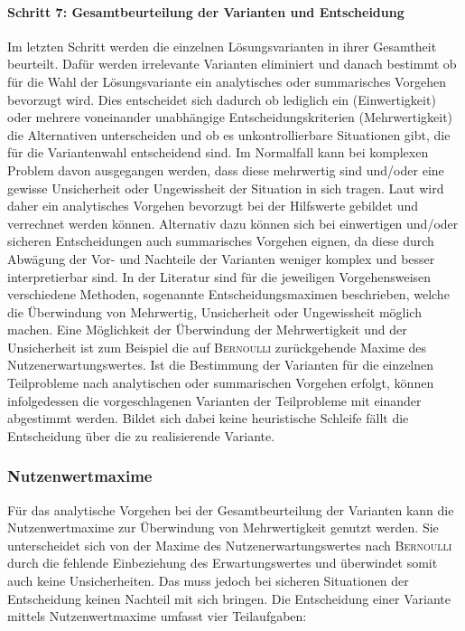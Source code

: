 \paragraph{Schritt 7: Gesamtbeurteilung der Varianten und Entscheidung} Im letzten Schritt werden die einzelnen Lösungsvarianten in ihrer Gesamtheit beurteilt. Dafür werden irrelevante Varianten eliminiert und danach bestimmt ob für die Wahl der Lösungsvariante ein analytisches oder summarisches Vorgehen bevorzugt wird. Dies entscheidet sich dadurch ob lediglich ein (Einwertigkeit) oder mehrere voneinander unabhängige Entscheidungskriterien (Mehrwertigkeit) die Alternativen unterscheiden und ob es unkontrollierbare Situationen gibt, die für die Variantenwahl entscheidend sind. Im Normalfall kann bei komplexen Problem davon ausgegangen werden, dass diese mehrwertig sind und/oder eine gewisse Unsicherheit oder Ungewissheit der Situation in sich tragen. Laut \cite{Grunig.2013} wird daher ein analytisches Vorgehen bevorzugt bei der Hilfswerte gebildet und verrechnet werden können. Alternativ dazu können sich bei einwertigen und/oder sicheren Entscheidungen auch summarisches Vorgehen eignen, da diese durch Abwägung der Vor- und Nachteile der Varianten weniger komplex und besser interpretierbar sind. 
In der Literatur sind für die jeweiligen Vorgehensweisen verschiedene Methoden, sogenannte Entscheidungsmaximen beschrieben, welche die Überwindung von Mehrwertig, Unsicherheit oder Ungewissheit möglich machen. Eine Möglichkeit der Überwindung der Mehrwertigkeit und der Unsicherheit ist zum Beispiel die auf \textsc{Bernoulli} zurückgehende Maxime des Nutzenerwartungswertes.\linebreak
Ist die Bestimmung der Varianten für die einzelnen Teilprobleme nach analytischen oder summarischen Vorgehen erfolgt, können infolgedessen die vorgeschlagenen Varianten der Teilprobleme mit einander abgestimmt werden. Bildet sich dabei keine heuristische Schleife fällt die Entscheidung über die zu realisierende Variante.

\subsubsection{Nutzenwertmaxime}
Für das analytische Vorgehen bei der Gesamtbeurteilung der Varianten kann die Nutzenwertmaxime zur Überwindung von Mehrwertigkeit genutzt werden. Sie unterscheidet sich von der Maxime des Nutzenerwartungswertes nach \textsc{Bernoulli} durch die fehlende Einbeziehung des Erwartungswertes und überwindet somit auch keine Unsicherheiten. Das muss jedoch bei sicheren Situationen der Entscheidung keinen Nachteil mit sich bringen. Die Entscheidung einer Variante mittels Nutzenwertmaxime umfasst vier Teilaufgaben: 
\vspace*{-2.5mm}
